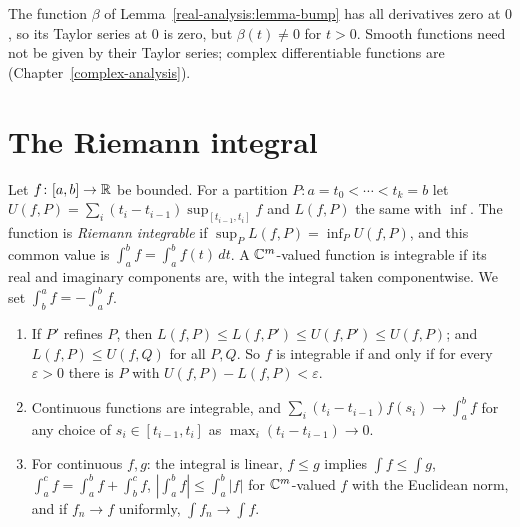 \begin{counterexample}\label{real-analysis:counterexample-not-analytic}
The function $\beta$ of Lemma~\ref{real-analysis:lemma-bump} has all derivatives zero at $0$, so its Taylor series at $0$ is zero, but $\beta(t) \neq 0$ for $t > 0$. Smooth functions need not be
given by their Taylor series; complex differentiable functions are (Chapter~\ref{complex-analysis}).
\end{counterexample}

\section{The Riemann integral}\label{real-analysis:section-riemann}

\begin{definition}\label{real-analysis:definition-riemann}
Let $f \colon [a, b] \to \mathbb{R}$ be bounded. For a partition $P \colon a = t_0 < \cdots < t_k = b$ let $U(f, P) = \sum_i(t_i - t_{i-1})\sup_{[t_{i-1}, t_i]}f$ and $L(f, P)$ the same with $\inf$. The function is
\emph{Riemann integrable} if $\sup_PL(f, P) = \inf_PU(f, P)$, and this common value is $\int_a^bf = \int_a^bf(t)\,dt$. A $\mathbb{C}^m$-valued function is integrable if its real and imaginary components are, with
the integral taken componentwise. We set $\int_b^af = -\int_a^bf$.
\end{definition}

\begin{proposition}\label{real-analysis:proposition-riemann}
\begin{enumerate}
\item If $P'$ refines $P$, then $L(f, P) \leq L(f, P') \leq U(f, P') \leq U(f, P)$; and $L(f, P) \leq U(f, Q)$ for all $P, Q$. So $f$ is integrable if and only if for every $\varepsilon > 0$ there is $P$ with
$U(f, P) - L(f, P) < \varepsilon$.
\item Continuous functions are integrable, and $\sum_i(t_i - t_{i-1})f(s_i) \to \int_a^bf$ for any choice of $s_i \in [t_{i-1}, t_i]$ as $\max_i(t_i - t_{i-1}) \to 0$.
\item For continuous $f, g$: the integral is linear, $f \leq g$ implies $\int f \leq \int g$, $\int_a^cf = \int_a^bf + \int_b^cf$, $|\int_a^bf| \leq \int_a^b|f|$ for $\mathbb{C}^m$-valued $f$ with the Euclidean
norm, and if $f_n \to f$ uniformly, $\int f_n \to \int f$.
\end{enumerate}
\end{proposition}

